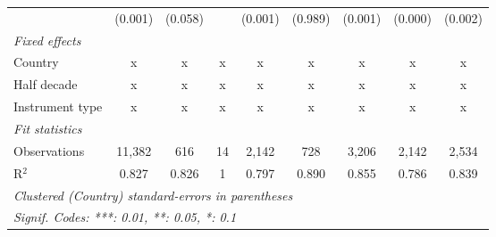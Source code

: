 \begin{table}[htbp]
\begin{tabular}{lcccccccc}
                                                                          & (0.001)       & (0.058)                   &              & (0.001)        & (0.989)          & (0.001)         & (0.000)         & (0.002)\\   
      \emph{Fixed effects}\\
      Country                                                             & x             & x                         & x            & x              & x                & x               & x               & x\\  
      Half decade                                                         & x             & x                         & x            & x              & x                & x               & x               & x\\  
      Instrument type                                                     & x             & x                         & x            & x              & x                & x               & x               & x\\  
      \midrule \emph{Fit statistics}\\
      Observations                                                        & 11,382        & 616                       & 14           & 2,142          & 728              & 3,206           & 2,142           & 2,534\\  
      R$^2$                                                               & 0.827         & 0.826                     & 1            & 0.797          & 0.890            & 0.855           & 0.786           & 0.839\\  
      \midrule
      \multicolumn{9}{l}{\emph{Clustered (Country) standard-errors in parentheses}}\\
      \multicolumn{9}{l}{\emph{Signif. Codes: ***: 0.01, **: 0.05, *: 0.1}}\\
   \end{tabular}
\end{table}


